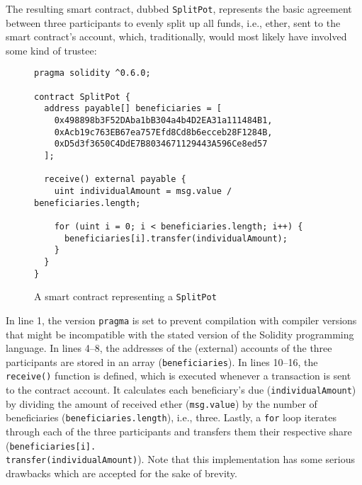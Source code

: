 The resulting smart contract, dubbed \texttt{SplitPot}, represents the basic agreement between three participants to evenly split up all funds, i.e., ether, sent to the smart contract's account, which, traditionally, would most likely have involved some kind of trustee:
\\
\begin{figure}[H]
\centering
\begin{lstlisting}
pragma solidity ^0.6.0;

contract SplitPot {
  address payable[] beneficiaries = [
    0x498898b3F52DAba1bB304a4b4D2EA31a111484B1,
    0xAcb19c763EB67ea757Efd8Cd8b6ecceb28F1284B,
    0xD5d3f3650C4DdE7B8034671129443A596Ce8ed57
  ];

  receive() external payable {
    uint individualAmount = msg.value / beneficiaries.length;
    
    for (uint i = 0; i < beneficiaries.length; i++) {
      beneficiaries[i].transfer(individualAmount);
    }
  }
}
\end{lstlisting}
\caption*{A smart contract representing a \texttt{SplitPot}}
\end{figure}

% 
% 
%     

In line 1, the version \texttt{pragma} is set to prevent compilation with compiler versions that might be incompatible with the stated version of the Solidity programming language.
In lines 4--8, the addresses of the (external) accounts of the three participants are stored in an array (\texttt{beneficiaries}).
In lines 10--16, the \texttt{receive()} function is defined, which is executed whenever a transaction is sent to the contract account.
It calculates each beneficiary's due (\texttt{individualAmount}) by dividing the amount of received ether (\texttt{msg.value}) by the number of beneficiaries (\texttt{beneficiaries.length}), i.e., three.
Lastly, a \texttt{for} loop iterates through each of the three participants and transfers them their respective share (\texttt{beneficiaries[i].\\transfer(individualAmount)}).
Note that this implementation has some serious drawbacks which are accepted for the sake of brevity.

